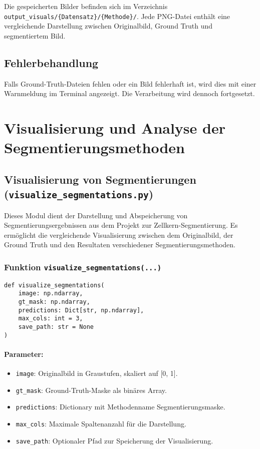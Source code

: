 \documentclass[a4paper,12pt]{article}
\begin{document}
Die gespeicherten Bilder befinden sich im Verzeichnis \texttt{output\_visuals/\{Datensatz\}/\{Methode\}/}. Jede PNG-Datei enthält eine vergleichende Darstellung zwischen Originalbild, Ground Truth und segmentiertem Bild.

\subsection*{ Fehlerbehandlung}

Falls Ground-Truth-Dateien fehlen oder ein Bild fehlerhaft ist, wird dies mit einer Warnmeldung im Terminal angezeigt. Die Verarbeitung wird dennoch fortgesetzt.


\section{Visualisierung und Analyse der Segmentierungsmethoden}

\subsection{Visualisierung von Segmentierungen (\texttt{visualize\_segmentations.py})}

Dieses Modul dient der Darstellung und Abspeicherung von Segmentierungsergebnissen aus dem Projekt zur Zellkern-Segmentierung. Es ermöglicht die vergleichende Visualisierung zwischen dem Originalbild, der Ground Truth und den Resultaten verschiedener Segmentierungsmethoden.

\subsubsection*{Funktion \texttt{visualize\_segmentations(...)}} 

\begin{verbatim}
def visualize_segmentations(
    image: np.ndarray,
    gt_mask: np.ndarray,
    predictions: Dict[str, np.ndarray],
    max_cols: int = 3,
    save_path: str = None
)
\end{verbatim}

\paragraph{Parameter:}
\begin{itemize}
    \item \texttt{image}: Originalbild in Graustufen, skaliert auf [0, 1].
    \item \texttt{gt\_mask}: Ground-Truth-Maske als binäres Array.
    \item \texttt{predictions}: Dictionary mit Methodenname \textrightarrow{} Segmentierungsmaske.
    \item \texttt{max\_cols}: Maximale Spaltenanzahl für die Darstellung.
    \item \texttt{save\_path}: Optionaler Pfad zur Speicherung der Visualisierung.
\end{itemize}
\end{document}
